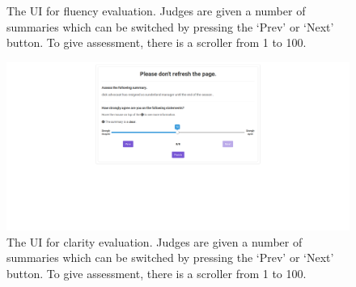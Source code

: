 \documentclass[11pt,a4paper]{article}
\begin{document}
\begin{figure}[h]
    \centering
    \caption{The UI for fluency evaluation. Judges are given a number of summaries which can be switched by pressing the `Prev' or `Next' button. To give assessment, there is a scroller from 1 to 100.}
\end{figure}
\begin{figure}[h]
    \centering
    \includegraphics[width=17cm]{clarity}
    \caption{The UI for clarity evaluation. Judges are given a number of summaries which can be switched by pressing the `Prev' or `Next' button. To give assessment, there is a scroller from 1 to 100.}
\end{figure}
\end{document}
